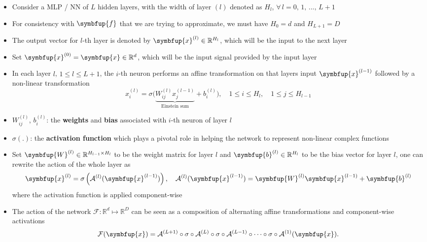 \documentclass[11pt]{extarticle}
\newcommand{\vf}{\symbfup{f}}
\newcommand{\vx}{\symbfup{x}}
\newcommand{\vb}{\symbfup{b}}
\newcommand{\vW}{\symbfup{W}}
\theoremstyle{definition}
\newcommand{\Ro}{\mathbb{R}}           	                %
\begin{document}
\begin{itemize}%
  \item Consider a MLP / NN of $L$ hidden layers, with the width of layer $(l)$ denoted as $H_l$, $\forall\,l=0,\,1,\,...,\,L+1$ 
  \item For consistency with $\vf$ that we are trying to approximate, we must have $H_0 = d$ and $H_{L+1} = D$
  \item The output vector for $l$-th layer is denoted by $\vx^{(l)}\in\Ro^{H_l}$, which will be the input to the next layer
  \item Set $\vx^{(0)} = \vx\in\Ro^d$, which will be the input signal provided by the input layer
  \item In each layer $l$, $1 \leqslant l \leqslant L+1$, the $i$-th neuron performs an affine transformation on that layers input $\vx^{(l-1)}$ followed by a non-linear transformation
    \begin{equation*}
      x_i^{(l)} = \sigma\Big(\underbrace{W^{(l)}_{ij} x_j^{(l-1)} }_{\text{Einstein sum}}+ b^{(l)}_i\Big), \quad 1 \leqslant i \leqslant H_l, \quad 1 \leqslant j \leqslant H_{l-1}
    \end{equation*}
  \item $W^{(l)}_{ij}$, $b^{(l)}_i$: the \textbf{weights} and \textbf{bias} associated with $i$-th neuron of layer $l$
  \item $\sigma(.)$: the \textbf{activation function} which plays a pivotal role in helping the network to represent non-linear complex functions
  \item Set $\vW^{(l)} \in \Ro^{H_{l-1} \times H_{l}}$ to be the weight matrix for layer $l$ and $\vb^{(l)} \in \Ro^{H_l}$ to be the bias vector for layer $l$, one can rewrite the action of the whole layer as
    \begin{equation}
      \vx^{(l)} = \sigma\left(\mathcal{A}^{(l)}(\vx^{(l-1)})\right), \quad \mathcal{A}^{(l)}(\vx^{(l-1)}) = \vW^{(l)} \vx^{(l-1)}+ \vb^{(l)}
    \end{equation}
    where the activation function is applied component-wise 
  \item The action of the network $\mathcal{F}: \Ro^d \mapsto \Ro^D$ can be seen as a composition of alternating affine transformations and component-wise activations
    \begin{equation}
      \mathcal{F}(\vx) = \mathcal{A}^{(L+1)} \circ \sigma \circ \mathcal{A}^{(L)} \circ  \sigma \circ \mathcal{A}^{(L-1)} \circ \cdots  \circ \sigma \circ \mathcal{A}^{(1)} (\vx).
    \end{equation}


\end{itemize}
\end{document}
